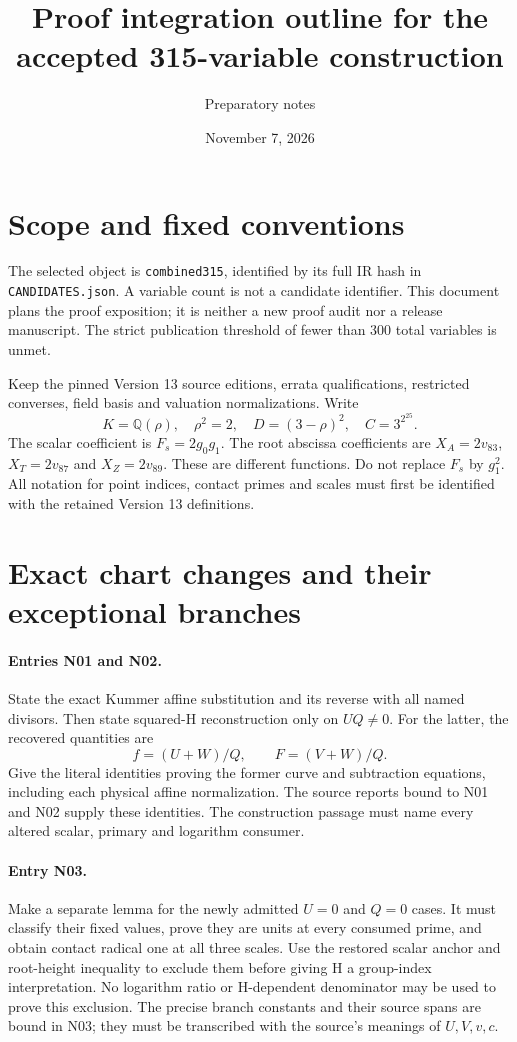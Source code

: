 \documentclass{article}
\begin{document}
\title{Proof integration outline for the accepted 315-variable construction}
\author{Preparatory notes}
\date{November 7, 2026}
\maketitle

\section{Scope and fixed conventions}\label{outline:scope}
The selected object is \texttt{combined315}, identified by its full IR hash
in \texttt{CANDIDATES.json}. A variable count is not a candidate identifier.
This document plans the proof exposition; it is neither a new proof audit
nor a release manuscript. The strict publication threshold of fewer than
300 total variables is unmet.

Keep the pinned Version 13 source editions, errata qualifications, restricted
converses, field basis and valuation normalizations. Write
\[
 K=\mathbb Q(\rho),\quad \rho^2=2,\quad D=(3-\rho)^2,
 \quad C=3^{2^{25}}.
\]
The scalar coefficient is $F_s=2g_0g_1$. The root abscissa coefficients
are $X_A=2v_{83}$, $X_T=2v_{87}$ and $X_Z=2v_{89}$.
These are different functions. Do not replace $F_s$ by $g_1^2$.
All notation for point indices, contact primes and scales must first be
identified with the retained Version 13 definitions.

\section{Exact chart changes and their exceptional branches}
\label{outline:charts}
\paragraph{Entries N01 and N02.}
State the exact Kummer affine substitution and its reverse with all named
divisors. Then state squared-H reconstruction only on $UQ\ne0$.
For the latter, the recovered quantities are
\[
 f=(U+W)/Q,\qquad F=(V+W)/Q.
\]
Give the literal identities proving the former curve and subtraction
equations, including each physical affine normalization. The source
reports bound to N01 and N02 supply these identities. The construction
passage must name every altered scalar, primary and logarithm consumer.

\paragraph{Entry N03.}
Make a separate lemma for the newly admitted $U=0$ and $Q=0$ cases.
It must classify their fixed values, prove they are units at every
consumed prime, and obtain contact radical one at all three scales.
Use the restored scalar anchor and root-height inequality to exclude
them before giving H a group-index interpretation. No logarithm ratio
or H-dependent denominator may be used to prove this exclusion.
The precise branch constants and their source spans are bound in N03;
they must be transcribed with the source's meanings of $U,V,v,c$.
\end{document}

